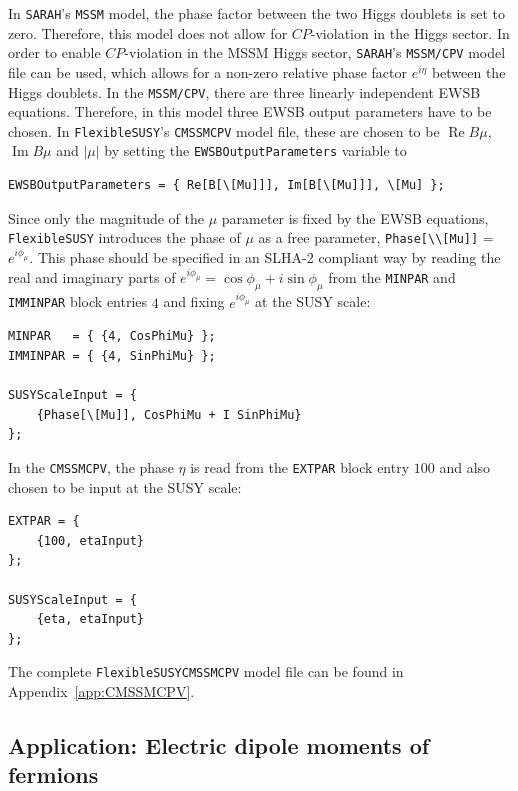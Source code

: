 \documentclass[final,3p,11pt,pdflatex]{elsarticle}
\makeatletter
\newcommand{\modelname}[1]{\texttt{#1}\@\xspace}
\newcommand{\sarah}{\texttt{SARAH}\@\xspace}
\newcommand{\fs}{\texttt{FlexibleSUSY}\@\xspace}
\newcommand{\code}[1]{\lstinline|#1|}  %
\newcommand{\appref}[1]{Appendix~\ref{#1}}
\newcommand{\CP}{\ensuremath{CP}\xspace}
\DeclareMathOperator{\re}{Re}
\DeclareMathOperator{\im}{Im}
\makeatother
\begin{document}
In \sarah's \modelname{MSSM} model, the phase factor between the two Higgs
doublets is set to zero.  Therefore, this model does not allow for
\CP-violation in the Higgs sector.  In order to enable \CP-violation in
the MSSM Higgs sector, \sarah's \modelname{MSSM/CPV} model file can be
used, which allows for a non-zero relative phase factor $e^{i\eta}$
between the Higgs doublets.  In the \modelname{MSSM/CPV}, there are three
linearly independent EWSB equations.  Therefore, in this model three
EWSB output parameters have to be chosen.  In \fs's \modelname{CMSSMCPV}
model file, these are chosen to be $\re B\mu$, $\im B\mu$ and $|\mu|$
by setting the \code{EWSBOutputParameters} variable to
%
\begin{lstlisting}
EWSBOutputParameters = { Re[B[\[Mu]]], Im[B[\[Mu]]], \[Mu] };
\end{lstlisting}
%
Since only the magnitude of the $\mu$ parameter is fixed by the EWSB
equations, \fs introduces the phase of $\mu$ as a free parameter,
\code{Phase[\\[Mu]]} = $e^{i\phi_\mu}$.  This phase should be specified in
an SLHA-2 compliant way by reading the real and imaginary parts of
$e^{i\phi_\mu} = \cos\phi_\mu + i \sin\phi_\mu$ from the \code{MINPAR}
and \code{IMMINPAR} block entries $4$ and fixing $e^{i\phi_\mu}$ at the
SUSY scale:
%
\begin{lstlisting}
MINPAR   = { {4, CosPhiMu} };
IMMINPAR = { {4, SinPhiMu} };

SUSYScaleInput = {
    {Phase[\[Mu]], CosPhiMu + I SinPhiMu}
};
\end{lstlisting}
%
In the \modelname{CMSSMCPV}, the phase $\eta$ is read from the \code{EXTPAR}
block entry $100$ and also chosen to be input at the SUSY scale:
%
\begin{lstlisting}
EXTPAR = {
    {100, etaInput}
};

SUSYScaleInput = {
    {eta, etaInput}
};
\end{lstlisting}
%
The complete \fs \modelname{CMSSMCPV} model file can be found in
\appref{app:CMSSMCPV}.

\subsection{Application: Electric dipole moments of fermions}
\end{document}
